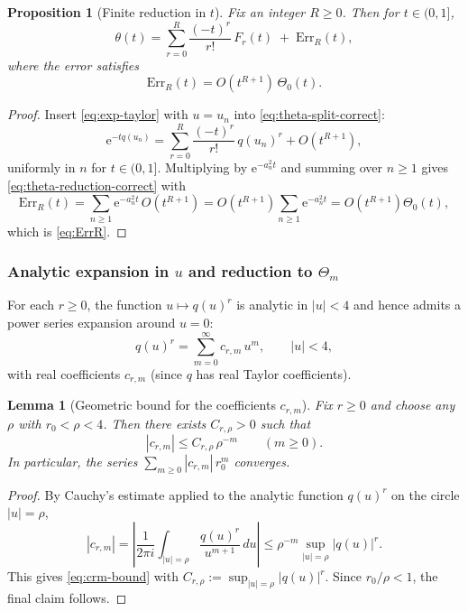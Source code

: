 \documentclass[11pt,letterpaper]{amsart}
\numberwithin{equation}{section}
\newtheorem{lemma}[theorem]{Lemma}
\newtheorem{proposition}[theorem]{Proposition}
\theoremstyle{definition}
\newcommand{\e}{\mathrm{e}}
\begin{document}
\begin{proposition}[Finite reduction in $t$]\label{prop:reduction}
Fix an integer $R\ge 0$. Then for $t\in(0,1]$,
\begin{equation}\label{eq:theta-reduction-correct}
\theta(t)=\sum_{r=0}^{R}\frac{(-t)^r}{r!}\,F_r(t)\;+\;\mathrm{Err}_R(t),
\end{equation}
where the error satisfies
\begin{equation}\label{eq:ErrR}
\mathrm{Err}_R(t)=O(t^{R+1})\,\Theta_0(t).
\end{equation}
\end{proposition}

\begin{proof}
Insert \eqref{eq:exp-taylor} with $u=u_n$ into \eqref{eq:theta-split-correct}:
\[
\e^{-tq(u_n)}=\sum_{r=0}^{R}\frac{(-t)^r}{r!}\,q(u_n)^r+O(t^{R+1}),
\]
uniformly in $n$ for $t\in(0,1]$. Multiplying by $\e^{-a_n^2 t}$ and summing over $n\ge 1$
gives \eqref{eq:theta-reduction-correct} with
\[
\mathrm{Err}_R(t)
=\sum_{n\ge 1}\e^{-a_n^2 t}\,O(t^{R+1})
=O(t^{R+1})\sum_{n\ge 1}\e^{-a_n^2 t}
=O(t^{R+1})\Theta_0(t),
\]
which is \eqref{eq:ErrR}.
\end{proof}

\subsubsection{Analytic expansion in $u$ and reduction to $\Theta_m$}\label{subsec:u-expansion}

For each $r\ge 0$, the function $u\mapsto q(u)^r$ is analytic in $|u|<4$ and hence admits
a power series expansion around $u=0$:
\begin{equation}\label{eq:q^r-series}
q(u)^r=\sum_{m=0}^\infty c_{r,m}\,u^m,\qquad |u|<4,
\end{equation}
with real coefficients $c_{r,m}$ (since $q$ has real Taylor coefficients).

\begin{lemma}[Geometric bound for the coefficients $c_{r,m}$]\label{lem:crm-bound}
Fix $r\ge 0$ and choose any $\rho$ with $r_0<\rho<4$. Then there exists $C_{r,\rho}>0$
such that
\begin{equation}\label{eq:crm-bound}
|c_{r,m}|\le C_{r,\rho}\,\rho^{-m}\qquad(m\ge 0).
\end{equation}
In particular, the series $\sum_{m\ge 0}|c_{r,m}|\,r_0^m$ converges.
\end{lemma}

\begin{proof}
By Cauchy's estimate applied to the analytic function $q(u)^r$ on the circle $|u|=\rho$,
\[
|c_{r,m}|=\left|\frac{1}{2\pi i}\int_{|u|=\rho}\frac{q(u)^r}{u^{m+1}}\,du\right|
\le \rho^{-m}\sup_{|u|=\rho}|q(u)|^r.
\]
This gives \eqref{eq:crm-bound} with $C_{r,\rho}:=\sup_{|u|=\rho}|q(u)|^r$.
Since $r_0/\rho<1$, the final claim follows.
\end{proof}
\end{document}
